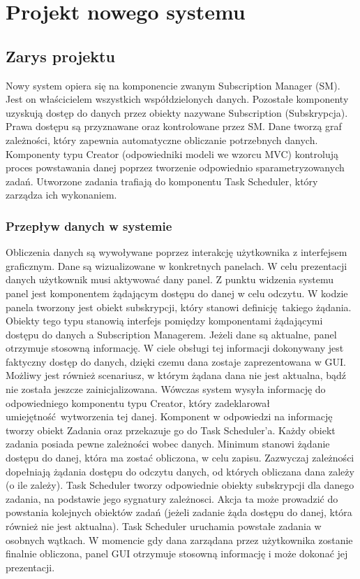 \chapter{Projekt nowego systemu}

\section{Zarys projektu}
Nowy system opiera się na komponencie zwanym Subscription Manager (SM). Jest on właścicielem wszystkich współdzielonych danych. Pozostałe komponenty uzyskują dostęp do danych przez obiekty nazywane Subscription (Subskrypcja). Prawa dostępu są przyznawane oraz kontrolowane przez SM. Dane tworzą graf zależności, który zapewnia automatyczne obliczanie potrzebnych danych. Komponenty typu Creator (odpowiedniki modeli we wzorcu MVC) kontrolują proces powstawania danej poprzez tworzenie odpowiednio sparametryzowanych zadań. Utworzone zadania trafiają do komponentu Task Scheduler, który zarządza ich wykonaniem.

\subsection{Przepływ danych w systemie} %


Obliczenia danych są wywoływane poprzez interakcję użytkownika z interfejsem graficznym. Dane są wizualizowane w konkretnych panelach. W celu prezentacji danych użytkownik musi aktywować dany panel. Z punktu widzenia systemu panel jest komponentem żądającym dostępu do danej w celu odczytu. W kodzie panela tworzony jest obiekt subskrypcji, który stanowi definicję takiego żądania. Obiekty tego typu stanowią interfejs pomiędzy komponentami żądającymi dostępu do danych a Subscription Managerem. Jeżeli dane są aktualne, panel otrzymuje stosowną informację. W ciele obsługi tej informacji dokonywany jest faktyczny dostęp do danych, dzięki czemu dana zostaje zaprezentowana w GUI. Możliwy jest również scenariusz, w którym żądana dana nie jest aktualna, bądź nie została jeszcze zainicjalizowana. Wówczas system wysyła informację do odpowiedniego komponentu typu Creator, który zadeklarował umiejętność wytworzenia tej danej. Komponent w odpowiedzi na informację tworzy obiekt Zadania oraz przekazuje go do Task Scheduler'a. Każdy obiekt zadania posiada pewne zależności wobec danych. Minimum stanowi żądanie dostępu do danej, która ma zostać obliczona, w celu zapisu. Zazwyczaj zależności dopełniają żądania dostępu do odczytu danych, od których obliczana dana zależy (o ile zależy). Task Scheduler tworzy odpowiednie obiekty subskrypcji dla danego zadania, na podstawie jego sygnatury zależnosci. Akcja ta może prowadzić do powstania kolejnych obiektów zadań (jeżeli zadanie żąda dostępu do danej, która również nie jest aktualna). Task Scheduler uruchamia powstałe zadania w osobnych wątkach. W momencie gdy dana zarządana przez użytkownika zostanie finalnie obliczona, panel GUI otrzymuje stosowną informację i może dokonać jej prezentacji.



